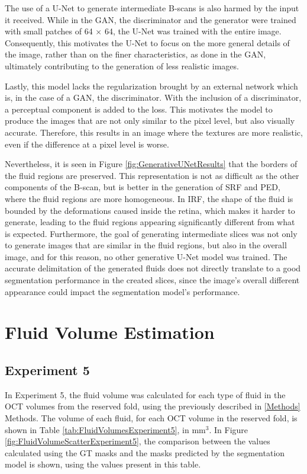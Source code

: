 \par
The use of a U-Net to generate intermediate B-scans is also harmed by the input it received. While in the GAN, the discriminator and the generator were trained with small patches of 64 $\times$ 64, the U-Net was trained with the entire image. Consequently, this motivates the U-Net to focus on the more general details of the image, rather than on the finer characteristics, as done in the GAN, ultimately contributing to the generation of less realistic images.
\par
Lastly, this model lacks the regularization brought by an external network which is, in the case of a GAN, the discriminator. With the inclusion of a discriminator, a perceptual component is added to the loss. This motivates the model to produce the images that are not only similar to the pixel level, but also visually accurate. Therefore, this results in an image where the textures are more realistic, even if the difference at a pixel level is worse.
\par
Nevertheless, it is seen in Figure \ref{fig:GenerativeUNetResults} that the borders of the fluid regions are preserved. This representation is not as difficult as the other components of the B-scan, but is better in the generation of SRF and PED, where the fluid regions are more homogeneous. In IRF, the shape of the fluid is bounded by the deformations caused inside the retina, which makes it harder to generate, leading to the fluid regions appearing significantly different from what is expected. Furthermore, the goal of generating intermediate slices was not only to generate images that are similar in the fluid regions, but also in the overall image, and for this reason, no other generative U-Net model was trained. The accurate delimitation of the generated fluids does not directly translate to a good segmentation performance in the created slices, since the image's overall different appearance could impact the segmentation model's performance.

\section{Fluid Volume Estimation}\label{FluidVolumeEstimation}

\subsection{Experiment 5}
In Experiment 5, the fluid volume was calculated for each type of fluid in the OCT volumes from the reserved fold, using the previously described in \ref{Methods} Methods. The volume of each fluid, for each OCT volume in the reserved fold, is shown in Table \ref{tab:FluidVolumesExperiment5}, in mm$^{3}$. In Figure \ref{fig:FluidVolumeScatterExperiment5}, the comparison between the values calculated using the GT masks and the masks predicted by the segmentation model is shown, using the values present in this table.

